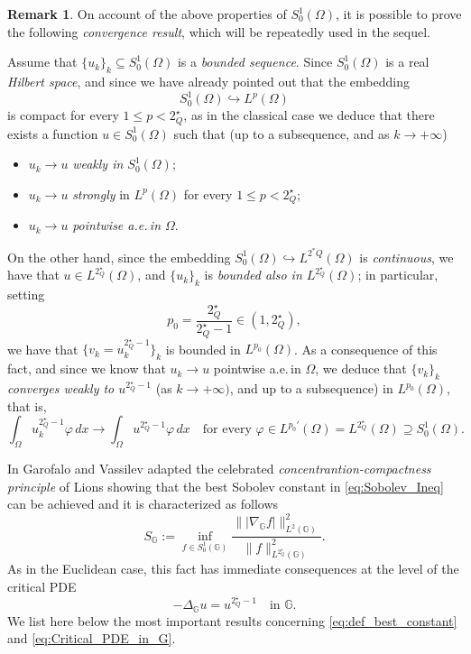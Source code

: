 \documentclass[11pt]{amsart}
\numberwithin{equation}{section} %
\theoremstyle{definition}
\newtheorem{rmk}[teo]{Remark}
\begin{document}
\begin{rmk} \label{rem:ConvergenceS01}
On account of the above properties of $S_0^1(\Omega)$, it is possible to prove
the following \emph{convergence result}, which will be repeatedly used in the sequel.

Assume that $\{u_k\}_k\subseteq S_0^1(\Omega)$ is a \emph{bounded sequence}. Since $S_0^1(\Omega)$ is a real \emph{Hilbert space}, and since we have already pointed out that the embedding 
  $$S_0^1(\Omega)\hookrightarrow L^p(\Omega)$$
  is compact for every $1\leq p< 2^\star_Q$, as in the classical case we deduce that there exists a function $u\in S_0^1(\Omega)$ such that (up to a subsequence, and as $k\to+\infty$)
  \vspace{0.1cm}
  
  \begin{itemize}
  	\item  $u_k\to u$ \emph{weakly in $S_0^1(\Omega)$};
  	\item $u_k\to u$ \emph{strongly} in $L^p(\Omega)$ for every $1\leq p< 2^\star_Q$;
  	\item $u_k\to u$ \emph{pointwise a.e.\,in $\Omega$}.
  \end{itemize}
  On the other hand, since the embedding $S_0^1(\Omega)\hookrightarrow L^{2^*Q}(\Omega)$ is \emph{continuous}, we have that $u\in L^{2^\star_Q}(\Omega)$, and  $\{u_k\}_k$ is \emph{bounded also in $L^{2^\star_Q}(\Omega)$}; in particular, setting 
  $$p_0 = \frac{2^\star_Q}{2^\star_Q-1}\in (1,2^\star_Q),$$
  we have that $\{v_k = u_k^{2^\star_Q-1}\}_k$ is bounded in $L^{p_0}(\Omega)$. As a consequence of this fact, and since we know that $u_k\to u$ po\-int\-wise a.e.\,in $\Omega$, we deduce that $\{v_k\}_k$ \emph{converges weakly to $u^{2^\star_Q-1}$}
  (as $k\to +\infty)$, and up to a subsequence) in $L^{p_0}(\Omega)$, that is, 
  $$\int_{\Omega}u_k^{2^\star_Q-1}\varphi\,dx \to \int_{\Omega}u^{2^\star_Q-1}\varphi\,dx\quad\text{for every $\varphi\in L^{p_0'}(\Omega)
  = L^{2^\star_Q}(\Omega)\supseteq S_0^1(\Omega)$}.$$
\end{rmk}

\medskip

In \cite{GaroVa} Garofalo and Vassilev adapted the celebrated {\em concentrantion-compactness principle} of Lions showing that the best Sobolev constant in \eqref{eq:Sobolev_Ineq} can be achieved and it is characterized as follows
\begin{equation}\label{eq:def_best_constant}
	S_{\mathbb{G}} := \inf_{f\in S^{1}_{0}(\mathbb{G})} \dfrac{\| |\nabla_{\mathbb{G}}f| \|^{2}_{L^{2}(\mathbb{G})}}{	\|f\|^{2}_{L^{2_{Q}^{\star}}(\mathbb{G})}}.
\end{equation}
As in the Euclidean case, this fact has immediate consequences at the level of the critical PDE
\begin{equation}\label{eq:Critical_PDE_in_G}
	-\Delta_{\mathbb{G}}u = u^{2^{\star}_{Q}-1} \quad \textrm{in } \mathbb{G}.
\end{equation}
We list here below the most important results concerning \eqref{eq:def_best_constant} and  \eqref{eq:Critical_PDE_in_G}.
\end{document}
